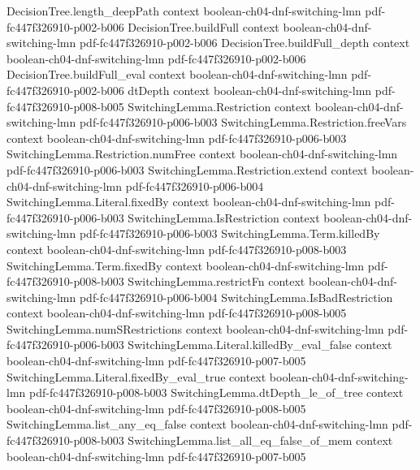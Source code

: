 \begin{theorem}
\proofstep
  {DecisionTree.length_deepPath}
  {context}
  {boolean-ch04-dnf-switching-lmn}
  {pdf-fc447f326910-p002-b006}
\proofstep
  {DecisionTree.buildFull}
  {context}
  {boolean-ch04-dnf-switching-lmn}
  {pdf-fc447f326910-p002-b006}
\proofstep
  {DecisionTree.buildFull_depth}
  {context}
  {boolean-ch04-dnf-switching-lmn}
  {pdf-fc447f326910-p002-b006}
\proofstep
  {DecisionTree.buildFull_eval}
  {context}
  {boolean-ch04-dnf-switching-lmn}
  {pdf-fc447f326910-p002-b006}
\proofstep
  {dtDepth}
  {context}
  {boolean-ch04-dnf-switching-lmn}
  {pdf-fc447f326910-p008-b005}
\proofstep
  {SwitchingLemma.Restriction}
  {context}
  {boolean-ch04-dnf-switching-lmn}
  {pdf-fc447f326910-p006-b003}
\proofstep
  {SwitchingLemma.Restriction.freeVars}
  {context}
  {boolean-ch04-dnf-switching-lmn}
  {pdf-fc447f326910-p006-b003}
\proofstep
  {SwitchingLemma.Restriction.numFree}
  {context}
  {boolean-ch04-dnf-switching-lmn}
  {pdf-fc447f326910-p006-b003}
\proofstep
  {SwitchingLemma.Restriction.extend}
  {context}
  {boolean-ch04-dnf-switching-lmn}
  {pdf-fc447f326910-p006-b004}
\proofstep
  {SwitchingLemma.Literal.fixedBy}
  {context}
  {boolean-ch04-dnf-switching-lmn}
  {pdf-fc447f326910-p006-b003}
\proofstep
  {SwitchingLemma.IsRestriction}
  {context}
  {boolean-ch04-dnf-switching-lmn}
  {pdf-fc447f326910-p006-b003}
\proofstep
  {SwitchingLemma.Term.killedBy}
  {context}
  {boolean-ch04-dnf-switching-lmn}
  {pdf-fc447f326910-p008-b003}
\proofstep
  {SwitchingLemma.Term.fixedBy}
  {context}
  {boolean-ch04-dnf-switching-lmn}
  {pdf-fc447f326910-p008-b003}
\proofstep
  {SwitchingLemma.restrictFn}
  {context}
  {boolean-ch04-dnf-switching-lmn}
  {pdf-fc447f326910-p006-b004}
\proofstep
  {SwitchingLemma.IsBadRestriction}
  {context}
  {boolean-ch04-dnf-switching-lmn}
  {pdf-fc447f326910-p008-b005}
\proofstep
  {SwitchingLemma.numSRestrictions}
  {context}
  {boolean-ch04-dnf-switching-lmn}
  {pdf-fc447f326910-p006-b003}
\proofstep
  {SwitchingLemma.Literal.killedBy_eval_false}
  {context}
  {boolean-ch04-dnf-switching-lmn}
  {pdf-fc447f326910-p007-b005}
\proofstep
  {SwitchingLemma.Literal.fixedBy_eval_true}
  {context}
  {boolean-ch04-dnf-switching-lmn}
  {pdf-fc447f326910-p008-b003}
\proofstep
  {SwitchingLemma.dtDepth_le_of_tree}
  {context}
  {boolean-ch04-dnf-switching-lmn}
  {pdf-fc447f326910-p008-b005}
\proofstep
  {SwitchingLemma.list_any_eq_false}
  {context}
  {boolean-ch04-dnf-switching-lmn}
  {pdf-fc447f326910-p008-b003}
\proofstep
  {SwitchingLemma.list_all_eq_false_of_mem}
  {context}
  {boolean-ch04-dnf-switching-lmn}
  {pdf-fc447f326910-p007-b005}

\end{theorem}
